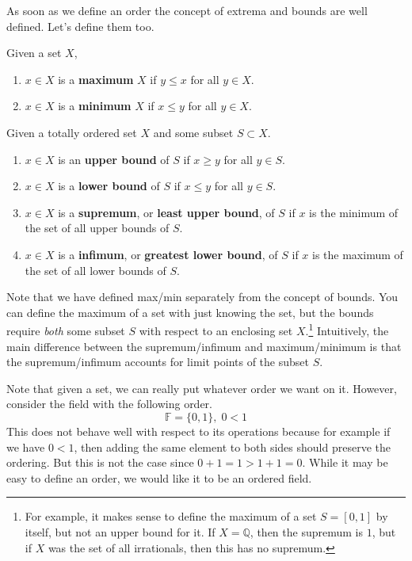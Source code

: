     As soon as we define an order the concept of extrema and bounds are well defined. Let's define them too. 

    \begin{definition}
      Given a set $X$, 
      \begin{enumerate}
        \item $x \in X$ is a \textbf{maximum} $X$ if $y \leq x$ for all $y \in X$. 
        \item $x \in X$ is a \textbf{minimum} $X$ if $x \leq y$ for all $y \in X$. 
      \end{enumerate}
      Given a totally ordered set $X$ and some subset $S \subset X$. 
      \begin{enumerate}
        \item $x \in X$ is an \textbf{upper bound} of $S$ if $x \geq y$ for all $y \in S$. 
        \item $x \in X$ is a \textbf{lower bound} of $S$ if $x \leq y$ for all $y \in S$. 
        \item $x \in X$ is a \textbf{supremum}, or \textbf{least upper bound}, of $S$ if $x$ is the minimum of the set of all upper bounds of $S$. 
        \item $x \in X$ is a \textbf{infimum}, or \textbf{greatest lower bound}, of $S$ if $x$ is the maximum of the set of all lower bounds of $S$. 
      \end{enumerate}
      Note that we have defined max/min separately from the concept of bounds. You can define the maximum of a set with just knowing the set, but the bounds require \textit{both} some subset $S$ with respect to an enclosing set $X$.\footnote{For example, it makes sense to define the maximum of a set $S = [0, 1]$ by itself, but not an upper bound for it. If $X = \mathbb{Q}$, then the supremum is $1$, but if $X$ was the set of all irrationals, then this has no supremum.} Intuitively, the main difference between the supremum/infimum and maximum/minimum is that the supremum/infimum accounts for limit points of the subset $S$. 
    \end{definition}

    Note that given a set, we can really put whatever order we want on it. However, consider the field with the following order. 
    \begin{equation}
      \mathbb{F} = \{0, 1\}, \; 0 < 1
    \end{equation} 
    This does not behave well with respect to its operations because for example if we have $0 < 1$, then adding the same element to both sides should preserve the ordering. But this is not the case since $0 + 1 = 1 > 1 + 1 = 0$. While it may be easy to define an order, we would like it to be an ordered field. 

